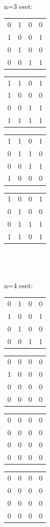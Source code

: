 \documentclass[paper=a4, fontsize=11pt]{article}
\begin{document}
\\
\\
\\
n=3 eset:
\begin{tabular}{cccc}
0&1&0&0\\
1&0&0&1\\
0&1&0&0\\
0&0&1&1
\end{tabular}
\quad
\begin{tabular}{cccc}
1&1&0&1\\
1&0&0&0\\
0&0&1&1\\
1&1&1&1
\end{tabular}
\quad
\begin{tabular}{cccc}
1&1&0&1\\
0&1&1&0\\
0&0&1&1\\
1&0&0&0
\end{tabular}
\quad
\begin{tabular}{cccc}
1&0&0&1\\
0&1&0&0\\
0&1&1&1\\
1&1&0&1
\end{tabular}
\\
\\
\\
n=4 eset:
\begin{tabular}{cccc}
0&1&0&0\\
1&0&0&1\\
0&1&0&0\\
0&0&1&1
\end{tabular}
\quad
\begin{tabular}{cccc}
0&0&0&0\\
1&0&0&0\\
0&0&0&0\\
0&0&0&0
\end{tabular}
\quad
\begin{tabular}{cccc}
0&0&0&0\\
0&0&0&0\\
0&0&0&0\\
0&0&0&0
\end{tabular}
\quad
\begin{tabular}{cccc}
0&0&0&0\\
0&0&0&0\\
0&0&0&0\\
0&0&0&0
\end{tabular}
\\
\\
\\
\end{document}
